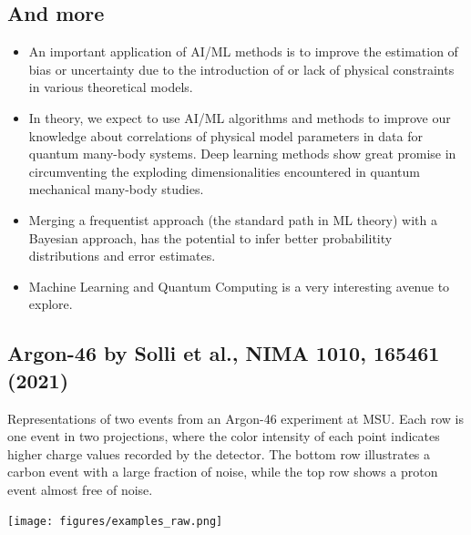 \documentclass[%
oneside,                 %
final,                   %
10pt]{article}
\begin{document}
\subsection{And more}

\begin{block}{}
\begin{itemize}
\item An important application of AI/ML methods is to improve the estimation of bias or uncertainty due to the introduction of or lack of physical constraints in various theoretical models.

\item In theory, we expect to use AI/ML algorithms and methods to improve our knowledge about  correlations of physical model parameters in data for quantum many-body systems. Deep learning methods show great promise in circumventing the exploding dimensionalities encountered in quantum mechanical many-body studies. 

\item Merging a frequentist approach (the standard path in ML theory) with a Bayesian approach, has the potential to infer better probabilitity distributions and error estimates. 

\item Machine Learning and Quantum Computing is a very interesting avenue to explore.
\end{itemize}

\noindent
\end{block}

\subsection{Argon-46 by Solli et al., NIMA 1010, 165461 (2021)}

\begin{block}{}
Representations of two events from an 
Argon-46 experiment at MSU. Each row is one event in two projections,
where the color intensity of each point indicates higher charge values
recorded by the detector. The bottom row illustrates a carbon event with
a large fraction of noise, while the top row shows a proton event
almost free of noise. 
\end{block}

\vspace{6mm}

\centerline{\texttt{[image: figures/examples\_raw.png]}}

\vspace{6mm}
\end{document}

